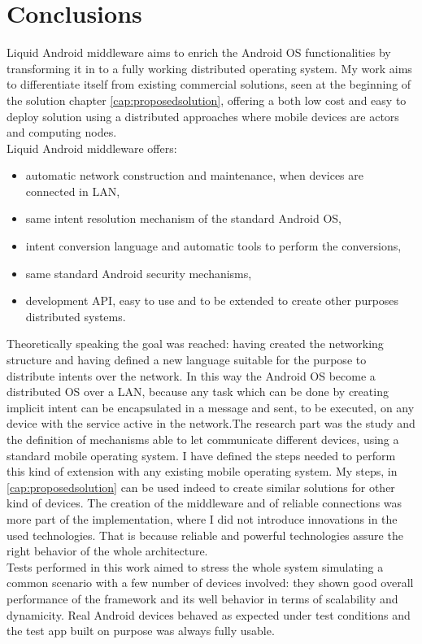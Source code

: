 \section{Conclusions}
Liquid Android middleware aims to enrich the Android OS functionalities by transforming it in to a fully working distributed operating system. My work aims to differentiate itself from existing commercial solutions, seen at the beginning of the solution chapter \ref{cap:proposedsolution}, offering a both low cost and easy to deploy solution using a distributed approaches where mobile devices are actors and computing nodes.\\
Liquid Android middleware offers:
\begin{itemize}
	\item automatic network construction and maintenance, when devices are connected in LAN,
	\item same intent resolution mechanism of the standard Android OS,
	\item intent conversion language and automatic tools to perform the conversions,
	\item same standard Android security mechanisms,
	\item development API, easy to use and to be extended to create other purposes distributed systems.
\end{itemize}
Theoretically speaking the goal was reached: having created the networking structure and having defined a new language suitable for the purpose to distribute intents over the network. In this way the Android OS become a distributed OS over a LAN, because any task which can be done by creating implicit intent can be encapsulated in a message and sent, to be executed, on any device with the service active in the network.The research part
was the study and the definition of mechanisms able to let communicate different devices, using a standard mobile operating system. I have defined the steps needed to perform this kind of extension with any existing mobile operating system. My steps, in \ref{cap:proposedsolution} can be used indeed to create similar solutions for other kind of devices. The creation of the middleware and of reliable connections was more part of the implementation, where I did not introduce innovations in the used technologies. That is because reliable and powerful technologies assure the right behavior of the whole architecture.\\
Tests performed in this work aimed to stress the whole system simulating a common scenario with a few number of devices involved: they shown good overall performance of the framework and its well behavior in terms of scalability and dynamicity. Real Android devices behaved as expected under test conditions and the test app built on purpose was always fully usable.\\

